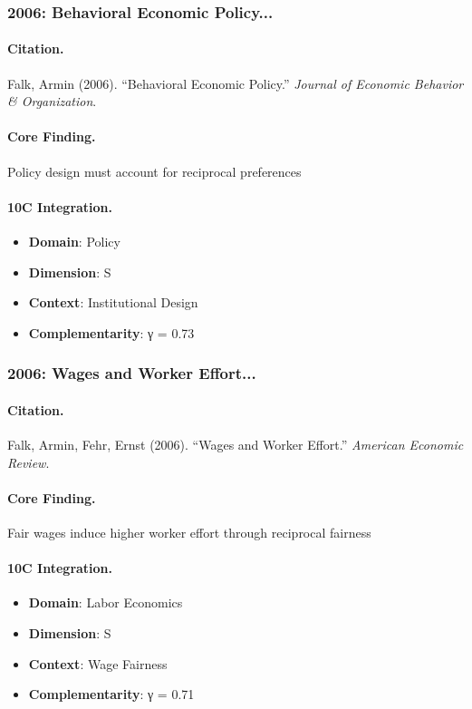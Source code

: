 \subsubsection{2006: Behavioral Economic Policy...}

\paragraph{Citation.}
Falk, Armin (2006). ``Behavioral Economic Policy.''
\textit{Journal of Economic Behavior & Organization}.

\paragraph{Core Finding.}
Policy design must account for reciprocal preferences

\paragraph{10C Integration.}
\begin{itemize}[nosep]
  \item \textbf{Domain}: Policy
  \item \textbf{Dimension}: S
  \item \textbf{Context}: Institutional Design
  \item \textbf{Complementarity}: γ = 0.73
\end{itemize}


\subsubsection{2006: Wages and Worker Effort...}

\paragraph{Citation.}
Falk, Armin, Fehr, Ernst (2006). ``Wages and Worker Effort.''
\textit{American Economic Review}.

\paragraph{Core Finding.}
Fair wages induce higher worker effort through reciprocal fairness

\paragraph{10C Integration.}
\begin{itemize}[nosep]
  \item \textbf{Domain}: Labor Economics
  \item \textbf{Dimension}: S
  \item \textbf{Context}: Wage Fairness
  \item \textbf{Complementarity}: γ = 0.71
\end{itemize}


